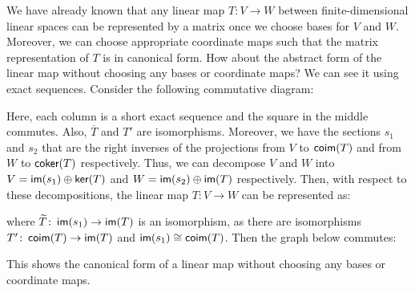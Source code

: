 We have already known that any linear map $T \colon V \to W$ between finite-dimensional linear spaces can be represented by a matrix once we choose bases for $V$ and $W$. Moreover, we can choose appropriate coordinate maps such that the matrix representation of $T$ is in canonical form. How about the abstract form of the linear map without choosing any bases or coordinate maps? We can see it using exact sequences. Consider the following commutative diagram:
\begin{center}
\end{center}
Here, each column is a short exact sequence and the square in the middle commutes. Also, $\overline{T}$ and $T'$ are isomorphisms. Moreover, we have the sections $s_1$ and $s_2$ that are the right inverses of the projections from $V$ to $\operatorname{\text{\normalfont\sffamily coim}}(T)$ and from $W$ to $\operatorname{\text{\normalfont\sffamily coker}}(T)$ respectively. Thus, we can decompose $V$ and $W$ into $V = \operatorname{\text{\normalfont\sffamily im}}(s_1) \oplus \operatorname{\text{\normalfont\sffamily ker}}(T)$ and $W = \operatorname{\text{\normalfont\sffamily im}}(s_2) \oplus \operatorname{\text{\normalfont\sffamily im}}(T)$ respectively. Then, with respect to these decompositions, the linear map $T \colon V \to W$ can be represented as:
\begin{center}
\end{center}
where $\widetilde{T} \colon \operatorname{\text{\normalfont\sffamily im}}(s_1) \to \operatorname{\text{\normalfont\sffamily im}}(T)$ is an isomorphism, as there are isomorphisms $T' \colon \operatorname{\text{\normalfont\sffamily coim}}(T) \to \operatorname{\text{\normalfont\sffamily im}}(T)$ and $\operatorname{\text{\normalfont\sffamily im}}(s_1) \cong \operatorname{\text{\normalfont\sffamily coim}}(T)$. Then the graph below commutes:
\begin{center}
\end{center}
This shows the canonical form of a linear map without choosing any bases or coordinate maps.

